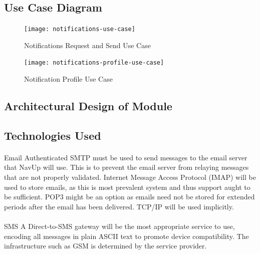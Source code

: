 \documentclass{article}
\begin{document}
\subsection{Use Case Diagram}
\begin{figure}[H]
\texttt{[image: notifications-use-case]}
\caption{Notifications Request and Send Use Case}
\end{figure}
\begin{figure}[H]
\texttt{[image: notifications-profile-use-case]}
\caption{Notification Profile Use Case}
\end{figure}

\subsection{Architectural Design of Module}

\subsection{Technologies Used}
\paragraph{}Email Authenticated SMTP must be used to send messages to the email server that
NavUp will use. This is to prevent the email server from relaying messages that are
not properly validated. Internet Message Access Protocol (IMAP) will be used to store
emails, as this is most prevalent system and thus support aught to be sufficient. POP3
might be an option as emails need not be stored for extended periods after the email
has been delivered. TCP/IP will be used implicitly.
\paragraph{}SMS A Direct-to-SMS gateway will be the most appropriate service to use, encoding
all messages in plain ASCII text to promote device compatibility. The infrastructure
such as GSM is determined by the service provider.
\end{document}
